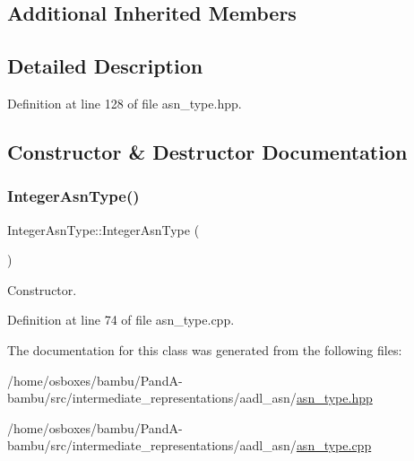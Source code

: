 \subsection*{Additional Inherited Members}


\subsection{Detailed Description}


Definition at line 128 of file asn\+\_\+type.\+hpp.



\subsection{Constructor \& Destructor Documentation}
\mbox{\label{classIntegerAsnType_a111aa2d1bb89ac97efa82191ba4a699d}} 
\subsubsection{\texorpdfstring{Integer\+Asn\+Type()}{IntegerAsnType()}}
{\footnotesize\ttfamily Integer\+Asn\+Type\+::\+Integer\+Asn\+Type (\begin{DoxyParamCaption}{ }\end{DoxyParamCaption})}



Constructor. 



Definition at line 74 of file asn\+\_\+type.\+cpp.



The documentation for this class was generated from the following files\+:\begin{DoxyCompactItemize}
\item 
/home/osboxes/bambu/\+Pand\+A-\/bambu/src/intermediate\+\_\+representations/aadl\+\_\+asn/\hyperlink{asn__type_8hpp}{asn\+\_\+type.\+hpp}\item 
/home/osboxes/bambu/\+Pand\+A-\/bambu/src/intermediate\+\_\+representations/aadl\+\_\+asn/\hyperlink{asn__type_8cpp}{asn\+\_\+type.\+cpp}\end{DoxyCompactItemize}
